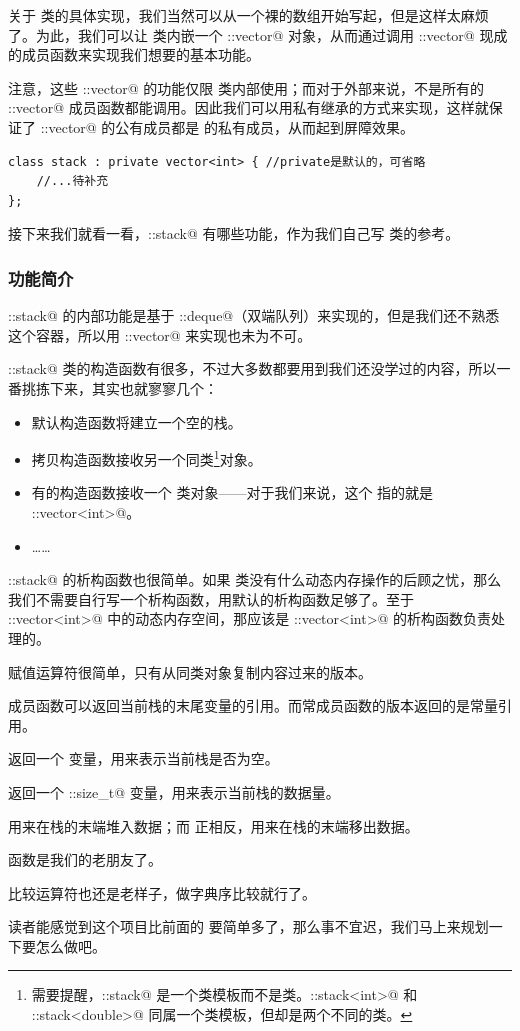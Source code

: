 关于 \lstinline@stack@ 类的具体实现，我们当然可以从一个裸的数组开始写起，但是这样太麻烦了。为此，我们可以让 \lstinline@stack@ 类内嵌一个 \lstinline@std::vector@ 对象，从而通过调用 \lstinline@std::vector@ 现成的成员函数来实现我们想要的基本功能。\par
注意，这些 \lstinline@std::vector@ 的功能仅限 \lstinline@stack@ 类内部使用；而对于外部来说，不是所有的 \lstinline@std::vector@ 成员函数都能调用。因此我们可以用私有继承的方式来实现，这样就保证了 \lstinline@std::vector@ 的公有成员都是 \lstinline@stack@ 的私有成员，从而起到屏障效果。
\begin{lstlisting}
class stack : private vector<int> { //private是默认的，可省略
    //...待补充
};
\end{lstlisting}
接下来我们就看一看，\lstinline@std::stack@ 有哪些功能，作为我们自己写 \lstinline@stack@ 类的参考。\par
\subsubsection*{功能简介}
\lstinline@std::stack@ 的内部功能是基于 \lstinline@std::deque@（双端队列）来实现的，但是我们还不熟悉这个容器，所以用 \lstinline@std::vector@ 来实现也未为不可。\par
\lstinline@std::stack@ 类的构造函数有很多，不过大多数都要用到我们还没学过的内容，所以一番挑拣下来，其实也就寥寥几个：
\begin{itemize}
    \item 默认构造函数将建立一个空的栈。
    \item 拷贝构造函数接收另一个同类\footnote{需要提醒，\lstinline@std::stack@ 是一个类模板而不是类。\lstinline@std::stack<int>@ 和 \lstinline@std::stack<double>@ 同属一个类模板，但却是两个不同的类。}对象。
    \item 有的构造函数接收一个 \lstinline@Container@ 类对象——对于我们来说，这个 \lstinline@Container@ 指的就是 \lstinline@std::vector<int>@。
    \item ……
\end{itemize}
\lstinline@std::stack@ 的析构函数也很简单。如果 \lstinline@stack@ 类没有什么动态内存操作的后顾之忧，那么我们不需要自行写一个析构函数，用默认的析构函数足够了。至于 \lstinline@std::vector<int>@ 中的动态内存空间，那应该是 \lstinline@std::vector<int>@ 的析构函数负责处理的。\par
赋值运算符很简单，只有从同类对象复制内容过来的版本。\par
\lstinline@top@ 成员函数可以返回当前栈的末尾变量的引用。而常成员函数的版本返回的是常量引用。\par
\lstinline@empty@ 返回一个 \lstinline@bool@ 变量，用来表示当前栈是否为空。\par
\lstinline@size@ 返回一个 \lstinline@std::size_t@ 变量，用来表示当前栈的数据量。\par
\lstinline@push@ 用来在栈的末端堆入数据；而 \lstinline@pop@ 正相反，用来在栈的末端移出数据。\par
\lstinline@swap@ 函数是我们的老朋友了。\par
比较运算符也还是老样子，做字典序比较就行了。\par
读者能感觉到这个项目比前面的 \lstinline@string@ 要简单多了，那么事不宜迟，我们马上来规划一下要怎么做吧。\par
